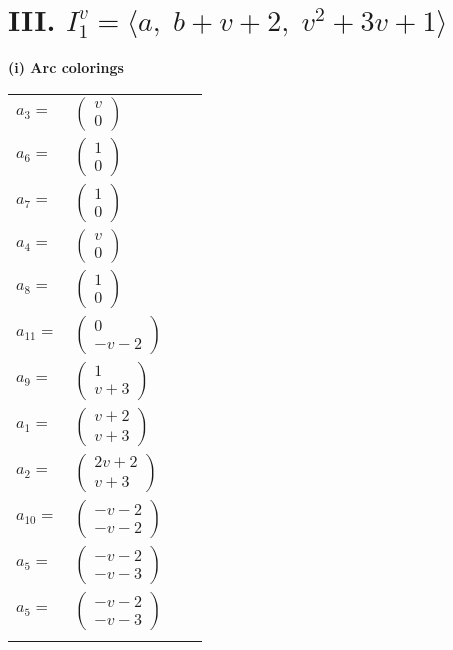 \documentclass[1p]{elsarticle_modified}
\theoremstyle{definition}
\begin{document}
\centering \section*{III. $I^v_{1}= \langle a,\;b+v+2,\;v^2+3 v+1 \rangle$}
\flushleft \textbf{(i) Arc colorings}\\
\begin{tabular}{m{7pt} m{180pt} m{7pt} m{180pt} }
\flushright $a_{3}=$&$\begin{pmatrix}v\\0\end{pmatrix}$ \\
\flushright $a_{6}=$&$\begin{pmatrix}1\\0\end{pmatrix}$ \\
\flushright $a_{7}=$&$\begin{pmatrix}1\\0\end{pmatrix}$ \\
\flushright $a_{4}=$&$\begin{pmatrix}v\\0\end{pmatrix}$ \\
\flushright $a_{8}=$&$\begin{pmatrix}1\\0\end{pmatrix}$ \\
\flushright $a_{11}=$&$\begin{pmatrix}0\\- v-2\end{pmatrix}$ \\
\flushright $a_{9}=$&$\begin{pmatrix}1\\v+3\end{pmatrix}$ \\
\flushright $a_{1}=$&$\begin{pmatrix}v+2\\v+3\end{pmatrix}$ \\
\flushright $a_{2}=$&$\begin{pmatrix}2 v+2\\v+3\end{pmatrix}$ \\
\flushright $a_{10}=$&$\begin{pmatrix}- v-2\\- v-2\end{pmatrix}$ \\
\flushright $a_{5}=$&$\begin{pmatrix}- v-2\\- v-3\end{pmatrix}$\\ \flushright $a_{5}=$&$\begin{pmatrix}- v-2\\- v-3\end{pmatrix}$\\&\end{tabular}
\end{document}
